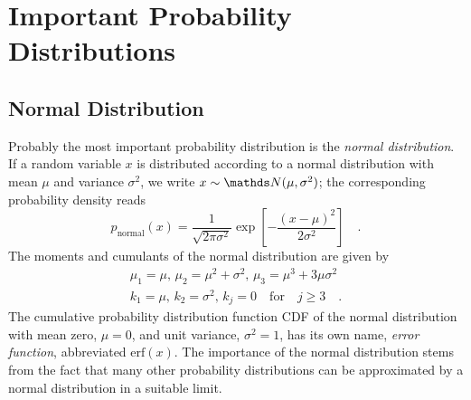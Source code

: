 \documentclass{notebook}
\begin{document}


\section{Important Probability Distributions}

\subsection*{Normal Distribution}

Probably the most important probability distribution is the \textit{normal distribution}.
If a random variable $x$ is distributed according to a normal distribution with mean $\mu$ and variance $\sigma^2$,
we write $x\sim\N(\mu, \sigma^2)$;  the corresponding probability density reads
%
\begin{equation}
p_\mathrm{normal}(x) = \frac{1}{\sqrt{2 \pi \sigma^2}} \exp[- \frac{(x- \mu)^2}{2 \sigma^2}] \quad.
\end{equation}
%
The moments and cumulants of the normal distribution are given by
%
\begin{gather*}
	\mu_1 = \mu, \, \mu_2 = \mu^2 + \sigma^2, \, \mu_3 = \mu^3 + 3 \mu \sigma^2 \\
	k_1 = \mu, \, k_2 = \sigma^2, \, k_j = 0 \quad \mathrm{for} \quad j \geq 3 \quad.
\end{gather*}
%
The cumulative probability distribution function CDF of the normal distribution  with mean zero, $\mu=0$, and unit variance, $\sigma^2=1$, has its own name, \textit{error function}, abbreviated $\mathrm{erf}(x)$. The importance of the normal distribution stems from the fact that  many other probability distributions can be approximated by a normal distribution in a suitable limit.
\end{document}
